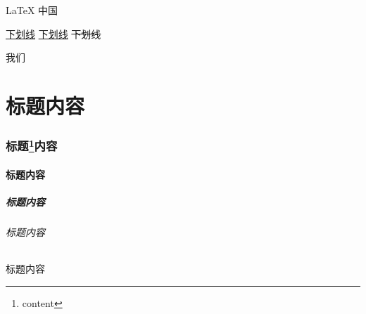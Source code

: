 \documentclass[a4paper, onecolumn, 10pt, space]{ctexart}
\begin{document}
{\kaishu{} \LaTeX{} 中国}

\begin{center}
    \lishu%
\end{center}

\underline{下划线}
\uline{下划线}
\sout{下划线}

\lettrine[lines = 1, lhang = 0.1, loversize = 0.1]{我} 们

\twocolumn[双栏]

\lipsum[7]

\newpage%

\lipsum[8]

\onecolumn

\newpage%


\part{标题内容}
\section{标题\footnote{content}内容}
\subsection{标题内容}
\subsubsection{标题内容}
\paragraph{标题内容}
\subparagraph{标题内容}

\newpage

\layout%

\newpage
\end{document}
